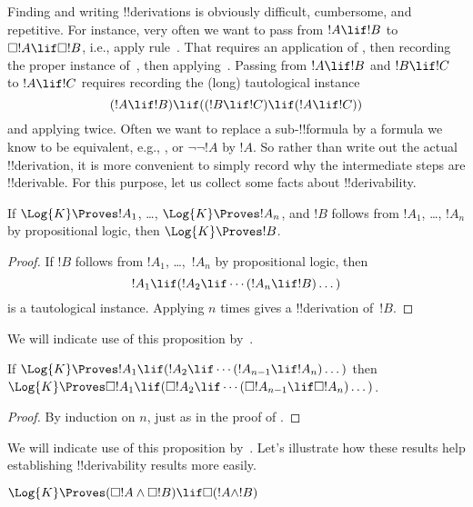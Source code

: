 \documentclass[../../../include/open-logic-section]{subfiles}
\begin{document}

Finding and writing !!{derivation}s is obviously difficult,
cumbersome, and repetitive. For instance, very often we want to pass
from $!A \lif !B$ to $\Box !A \lif \Box !B$, i.e., apply
rule~\RK. That requires an application of \Nec, then recording the
proper instance of~, then applying~\MP. Passing from $!A \lif
!B$ and $!B \lif !C$ to $!A \lif !C$ requires recording the (long)
tautological instance
\[
(!A \lif !B) \lif ((!B \lif !C) \lif (!A \lif !C))
\]
and applying \MP{} twice. Often we want to replace a sub-!!{formula}
by a formula we know to be equivalent, e.g., , or
$\lnot\lnot !A$ by $!A$. So rather than write out the actual
!!{derivation}, it is more convenient to simply record why the
intermediate steps are !!{derivable}. For this purpose, let us collect
some facts about !!{derivability}.

\begin{prop}
  If $\Log{K} \Proves !A_1$, \dots, $\Log{K} \Proves !A_n$, and $!B$
  follows from $!A_1$, \dots, $!A_n$ by propositional logic, then
  $\Log{K} \Proves !B$.
\end{prop}

\begin{proof}
  If $!B$ follows from $!A_1$, \dots,~$!A_n$ by propositional logic, then
  \[
  !A_1 \lif (!A_2 \lif \cdots (!A_n \lif !B)\dots)
  \]
  is a tautological instance. Applying \MP{} $n$ times gives a
  !!{derivation} of~$!B$.
\end{proof}

We will indicate use of this proposition by~\PL.

\begin{prop}
  If $\Log{K} \Proves !A_1 \lif (!A_2 \lif \cdots (!A_{n-1} \lif
  !A_n)\dots)$ then $\Log{K} \Proves \Box !A_1 \lif (\Box !A_2 \lif
  \cdots (\Box !A_{n-1} \lif \Box !A_n)\dots)$.
\end{prop}

\begin{proof}
  By induction on $n$, just as in the proof of .
\end{proof}

We will indicate use of this proposition by~\RK. Let's illustrate how
these results help establishing !!{derivability} results more easily.

\begin{prop}
  $\Log{K} \Proves (\Box!A \land \Box!B) \lif \Box (!A \land !B)$
\end{prop}
\end{document}

